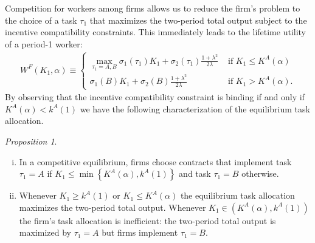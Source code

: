 \documentclass[12pt,american]{paper}
\theoremstyle{remark}
\newtheorem{prop}{Proposition}
\begin{document}
Competition  for workers among firms allows us to reduce the firm's problem to the choice of a task $\tau_1$ that maximizes the two-period total output subject to the incentive compatibility constraints. This immediately leads to the lifetime utility of a period-1 worker:
\begin{align*}
W^F(K_1,\alpha) \equiv
\begin{cases}
\max_{\tau_1=A,B}\sigma_1(\tau_1)K_1+\sigma_2(\tau_1)\frac{1+\lambda^2}{2\lambda} &\text{ if } K_1\leq K^A(\alpha)\\
\sigma_1(B)K_1+\sigma_2(B)\frac{1+\lambda^2}{2\lambda} &\text{ if } K_1>K^A(\alpha).
\end{cases}
\end{align*}
%
By observing that the incentive compatibility constraint is binding if and only if $K^A(\alpha) < k^A(1)$ we have the following characterization of the equilibrium task allocation.
\begin{prop}\label{lem:firms_choice}
\begin{enumerate}[(i)]\setlength\itemsep{0em}
\item In a competitive equilibrium, firms choose contracts that implement task $\tau_1=A$ if $K_1\leq \min\left\lbrace K^A(\alpha), k^A(1) \right \rbrace $ and task $\tau_1=B$ otherwise.
\item Whenever $K_1 \geq  k^A(1)$ or $K_1 \leq K^A(\alpha)$ the equilibrium task allocation maximizes the two-period total output.
 Whenever $K_1 \in \left( K^A(\alpha), k^A(1) \right)$  the firm's task allocation is inefficient: the two-period total output is maximized by $\tau_1=A$ but firms implement $\tau_1=B$.
\end{enumerate}
\end{prop}
%
\end{document}
